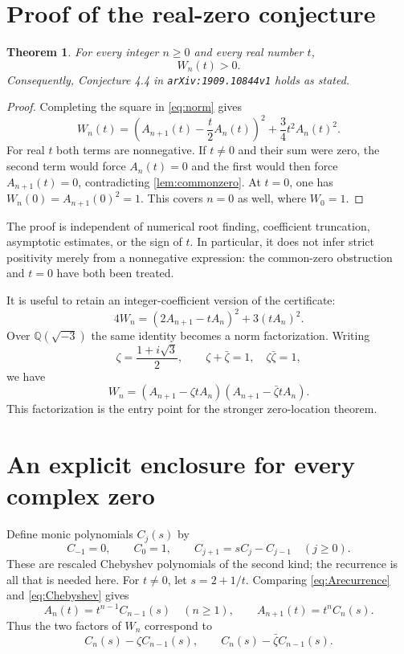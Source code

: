 \documentclass[11pt]{article}
\numberwithin{equation}{section}
\newtheorem{theorem}{Theorem}[section]
\theoremstyle{definition}
\newcommand{\Q}{\mathbb Q}
\begin{document}
\section{Proof of the real-zero conjecture}\label{sec:positivity}

\begin{theorem}\label{thm:positive}
For every integer $n\geq0$ and every real number $t$,
\[
 \boxed{\ W_n(t)>0.\ }
\]
Consequently, Conjecture 4.4 in \texttt{arXiv:1909.10844v1} holds as stated.
\end{theorem}
\begin{proof}
Completing the square in \eqref{eq:norm} gives
\[
 W_n(t)=\left(A_{n+1}(t)-\frac t2 A_n(t)\right)^2
             +\frac34t^2A_n(t)^2.
\]
For real $t$ both terms are nonnegative.  If $t\neq0$ and their sum were
zero, the second term would force $A_n(t)=0$ and the first would then force
$A_{n+1}(t)=0$, contradicting \cref{lem:commonzero}.
At $t=0$, one has $W_n(0)=A_{n+1}(0)^2=1$.
This covers $n=0$ as well, where $W_0=1$.
\end{proof}

The proof is independent of numerical root finding, coefficient truncation,
asymptotic estimates, or the sign of $t$.  In particular, it does not infer
strict positivity merely from a nonnegative expression: the common-zero
obstruction and $t=0$ have both been treated.

It is useful to retain an integer-coefficient version of the certificate:
\begin{equation}\label{eq:integercertificate}
 4W_n=(2A_{n+1}-tA_n)^2+3(tA_n)^2.
\end{equation}
Over $\Q(\sqrt{-3})$ the same identity becomes a norm factorization.
Writing
\begin{equation}\label{eq:zeta}
 \zeta=\frac{1+i\sqrt3}{2},\qquad
 \zeta+\bar\zeta=1,\quad \zeta\bar\zeta=1,
\end{equation}
we have
\begin{equation}\label{eq:complexfactor}
 W_n=(A_{n+1}-\zeta tA_n)(A_{n+1}-\bar\zeta tA_n).
\end{equation}
This factorization is the entry point for the stronger zero-location theorem.

\section{An explicit enclosure for every complex zero}\label{sec:spectral}

Define monic polynomials $C_j(s)$ by
\begin{equation}\label{eq:Chebyshev}
 C_{-1}=0,\qquad C_0=1,\qquad
 C_{j+1}=sC_j-C_{j-1}\quad(j\geq0).
\end{equation}
These are rescaled Chebyshev polynomials of the second kind; the recurrence
is all that is needed here.  For $t\neq0$, let $s=2+1/t$.
Comparing \eqref{eq:Arecurrence} and \eqref{eq:Chebyshev} gives
\begin{equation}\label{eq:Acheb}
 A_n(t)=t^{n-1}C_{n-1}(s)\quad(n\geq1),\qquad
 A_{n+1}(t)=t^n C_n(s).
\end{equation}
Thus the two factors of $W_n$ correspond to
\[
 C_n(s)-\zeta C_{n-1}(s),\qquad
 C_n(s)-\bar\zeta C_{n-1}(s).
\]
\end{document}
